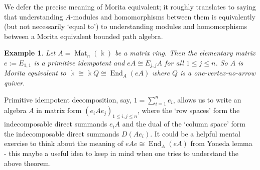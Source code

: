 \documentclass[11pt,a4paper]{article}
\makeatletter
\numberwithin{equation}{section}
\renewenvironment{proof}[1][\proofname]{\par
    \pushQED{\qed}%
    \normalfont \topsep0\p@\@plus6\p@ \labelsep1em\relax
    \trivlist
    \item[\hskip\labelsep\indent
        \bfseries #1]\ignorespaces
    \mbox{}
}{
    \popQED\endtrivlist\@endpefalse
}
\theoremstyle{all}
\newtheorem{lemma}[theorem]{Lemma}
\newtheorem{example}[theorem]{Example}
\theoremstyle{remark}
\DeclareMathOperator{\isom}{\cong}
\newcommand{\rad}{\operatorname{rad}\nolimits}
\newcommand{\Hom}{\operatorname{Hom}\nolimits}
\newcommand{\End}{\operatorname{End}\nolimits}
\newcommand{\Mat}{\operatorname{Mat}\nolimits}
\makeatother
\begin{document}
We defer the precise meaning of Morita equivalent; it roughly translates to saying that understanding $A$-modules and homomorphisms between them is equivalently (but not necessarily `equal to') to understanding modules and homomorphisms between a Morita equivalent bounded path algebra.

\begin{example}
Let $A=\Mat_n(\Bbbk)$ be a matrix ring.
Then the elementary matrix $e:=E_{1,1}$ is a primitive idempotent and $eA\cong E_{j,j}A$ for all $1\leq j\leq n$.
So $A$ is Morita equivalent to $\Bbbk \cong \Bbbk Q \cong \End_A(eA)$ where $Q$ is a one-vertex-no-arrow quiver.
\end{example}

Primitive idempotent decomposition, say, $1=\sum_{i=1}^ne_i$, allows us to write an algebra $A$ in matrix form $( e_iAe_j )_{1\leq i,j\leq n}$, where the `row spaces' form the indecomposable direct summands $e_iA$ and the dual of the `column space' form the indecomposable direct summands $D(Ae_i)$.
It could be a helpful mental exercise to think about the meaning of $eAe\cong \End_A(eA)$ from Yoneda lemma - this maybe a useful idea to keep in mind when one tries to understand the above theorem.

%
%
%
\end{document}
